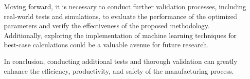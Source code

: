 Moving forward, it is necessary to conduct further validation processes, including real-world tests and simulations, to evaluate the performance of the optimized parameters and verify the effectiveness of the proposed methodology. Additionally, exploring the implementation of machine learning techniques for best-case calculations could be a valuable avenue for future research.

In conclusion, conducting additional tests and thorough validation can greatly enhance the efficiency, productivity, and safety of the manufacturing process.